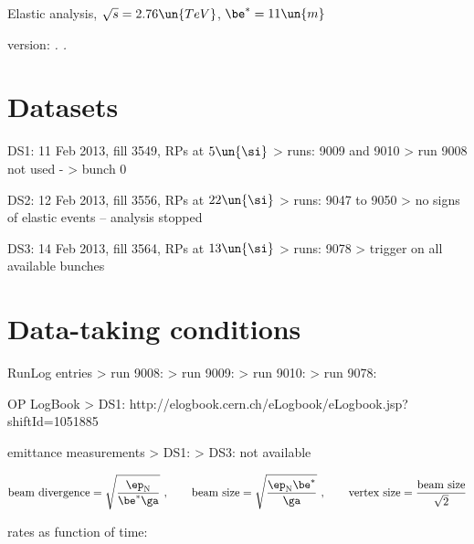 


\NumberSectionstrue

\def\baseDir{/afs/cern.ch/work/j/jkaspar/analyses/elastic/1380GeV,beta11}
\def\release{}



\centerline{\SetFontSizesXX Elastic analysis, $\sqrt s = 2.76\un{TeV}$, $\be^* = 11\un{m}$ }
\vskip2mm
\centerline{version: {\it \number\day. \number\month. \number\year}}

\section{Datasets}

\> DS1: 11 Feb 2013, fill 3549, RPs at $5\un{\si}$
\>> runs: 9009 and 9010
\>> run 9008 not used - 
\>> bunch 0

\> DS2: 12 Feb 2013, fill 3556, RPs at $22\un{\si}$
\>> runs: 9047 to 9050
\>> no signs of elastic events -- analysis stopped

\> DS3: 14 Feb 2013, fill 3564, RPs at $13\un{\si}$
\>> runs: 9078
\>> trigger on all available bunches

\section{Data-taking conditions}

\> RunLog entries
\>> run 9008: 
\>> run 9009: 
\>> run 9010: 
\>> run 9078: 

\> OP LogBook
\>> DS1: http://elogbook.cern.ch/eLogbook/eLogbook.jsp?shiftId=1051885

\> emittance measurements
\>> DS1: 
\>> DS3: not available

$$
\hbox{beam divergence} = \sqrt{\ep_{\rm N} \over \be^* \ga}\ ,\qquad
\hbox{beam size} = \sqrt{\ep_{\rm N} \be^*\over \ga}\ ,\qquad
\hbox{vertex size} = {\hbox{beam size}\over \sqrt 2}
$$

\> rates as function of time: 

